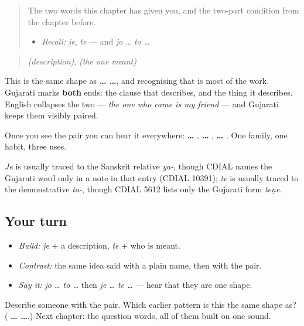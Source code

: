 \label{lesson:GU-C36-je-te}



\begin{quote}
The two words this chapter has given you, and the two-part condition from the chapter before.

\begin{itemize}
\raggedright
  \item \emph{Recall:} \emph{je}, \emph{te} — and \emph{jo … to …}
\end{itemize}
\end{quote}

\begin{cousinweb}
\begin{quote}
\textbf{} \emph{(description)}, \textbf{} \emph{(the one meant)}
\end{quote}

This is the same shape as \textbf{ …  …}, and recognising that is most of the work. Gujarati marks \textbf{both} ends: the clause that describes, and the thing it describes. English collapses the two — \emph{the one who came is my friend} — and Gujarati keeps them visibly paired.

Once you see the pair you can hear it everywhere: \textbf{ … }, \textbf{ … }, \textbf{ … }. One family, one habit, three uses.

\emph{Je} is usually traced to the Sanskrit relative \emph{ya-}, though CDIAL names the Gujarati word only in a note in that entry (CDIAL 10391); \emph{te} is usually traced to the demonstrative \emph{ta-}, though CDIAL 5612 lists only the Gujarati form \emph{teṇe}.
\end{cousinweb}

\subsection*{Your turn}
\begin{itemize}
\raggedright
  \item \emph{Build:} \emph{je} + a description, \emph{te} + who is meant.
  \item \emph{Contrast:} the same idea said with a plain name, then with the pair.
  \item \emph{Say it:} \emph{jo … to …} then \emph{je … te …} — hear that they are one shape.
\end{itemize}

\begin{tcolorbox}[breakable,colback=teal!4,colframe=teal!35!black,title={Before you move on}]
Describe someone with the pair. Which earlier pattern is this the same shape as? (\textbf{ …  …}.) Next chapter: the question words, all of them built on one sound.
\end{tcolorbox}
